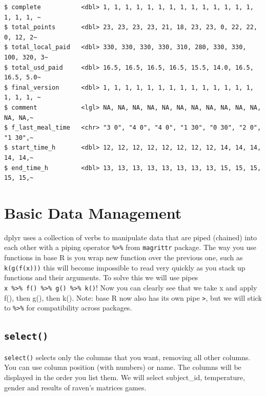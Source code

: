 \documentclass[
  letterpaper,
]{book}
\begin{document}
\begin{verbatim}
$ complete           <dbl> 1, 1, 1, 1, 1, 1, 1, 1, 1, 1, 1, 1, 1, 1, 1, 1, 1, ~
$ total_points       <dbl> 23, 23, 23, 23, 21, 18, 23, 23, 0, 22, 22, 0, 12, 2~
$ total_local_paid   <dbl> 330, 330, 330, 330, 310, 280, 330, 330, 100, 320, 3~
$ total_usd_paid     <dbl> 16.5, 16.5, 16.5, 16.5, 15.5, 14.0, 16.5, 16.5, 5.0~
$ final_version      <dbl> 1, 1, 1, 1, 1, 1, 1, 1, 1, 1, 1, 1, 1, 1, 1, 1, 1, ~
$ comment            <lgl> NA, NA, NA, NA, NA, NA, NA, NA, NA, NA, NA, NA, NA,~
$ f_last_meal_time   <chr> "3 0", "4 0", "4 0", "1 30", "0 30", "2 0", "1 30",~
$ start_time_h       <dbl> 12, 12, 12, 12, 12, 12, 12, 12, 14, 14, 14, 14, 14,~
$ end_time_h         <dbl> 13, 13, 13, 13, 13, 13, 13, 13, 15, 15, 15, 15, 15,~
\end{verbatim}

\hypertarget{basic-data-management}{%
\section{Basic Data Management}\label{basic-data-management}}

dplyr uses a collection of verbs to manipulate data that are piped
(chained) into each other with a piping operator
\texttt{\%\textgreater{}\%} from \texttt{magrittr} package. The way you
use functions in base R is you wrap new function over the previous one,
such as \texttt{k(g(f(x)))} this will become impossible to read very
quickly as you stack up functions and their arguments. To solve this we
will use pipes
\texttt{x\ \%\textgreater{}\%\ f()\ \%\textgreater{}\%\ g()\ \%\textgreater{}\%\ k()}!
Now you can clearly see that we take x and apply f(), then g(), then
k(). Note: base R now also has its own pipe
\texttt{\textbar{}\textgreater{}}, but we will stick to
\texttt{\%\textgreater{}\%} for compatibility across packages.

\hypertarget{select}{%
\subsection{\texorpdfstring{\texttt{select()}}{select()}}\label{select}}

\texttt{select()} selects only the columns that you want, removing all
other columns. You can use column position (with numbers) or name. The
columns will be displayed in the order you list them. We will select
subject\_id, temperature, gender and results of raven's matrices games.
\end{document}
